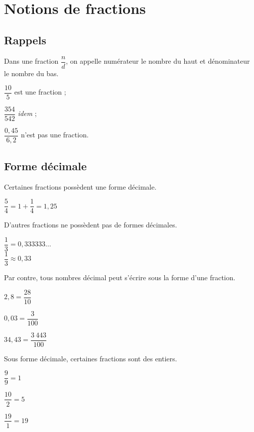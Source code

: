 \documentclass[11pt]{article}
\begin{document}
\section{Notions de fractions}

\subsection{Rappels}

\begin{vocabulaire}
Dans une fraction $\dfrac{n}{d}$, on appelle numérateur le nombre du
haut et dénominateur le nombre du bas.
\end{vocabulaire}

\begin{exemple}
  \begin{enu}
  \item $\dfrac{10}{5}$ est une fraction ;
  \item $\dfrac{354}{542}$ \textit{idem} ;
  \item $\dfrac{0,45}{6,2}$ n'est pas une fraction.
  \end{enu}
\end{exemple}

\subsection{Forme décimale}

\begin{propriete}
Certaines fractions possèdent une forme décimale.
\end{propriete}

\begin{exemple}
$\dfrac{5}{4}=1 + \dfrac{1}{4} = 1,25$
\end{exemple}

\begin{propriete}
D'autres fractions ne possèdent pas de formes décimales.
\end{propriete}

\begin{exemple}
$\dfrac{1}{3}=0,333333\ldots$ \\
$\dfrac{1}{3} \approx 0,33$
\end{exemple}

\begin{propriete}
Par contre, tous nombres décimal peut s'écrire sous la forme d'une
fraction. 
\end{propriete}

\begin{exemple}
  \begin{enu}
  \item $2,8=\dfrac{28}{10}$
  \item $0,03=\dfrac{3}{100}$
  \item $34,43=\dfrac{3~443}{100}$
  \end{enu}
\end{exemple}

\begin{remarque}
Sous forme décimale, certaines fractions sont des entiers.
\end{remarque}

\begin{exemple}
  \begin{enu}
  \item $\dfrac{9}{9}=1$
  \item $\dfrac{10}{2}=5$
  \item $\dfrac{19}{1}=19$
  \end{enu}
\end{exemple}
\end{document}
